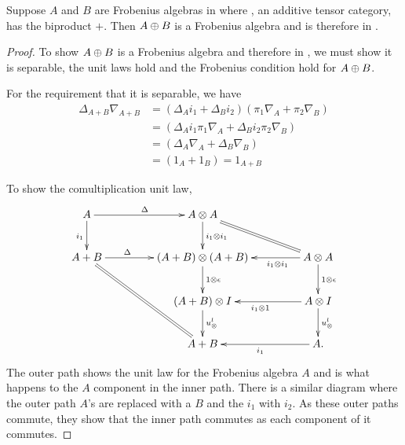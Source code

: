 \begin{lemma}\label{prop:biproducts-of-frobenius-objects-are-frobenius}
  Suppose $A$ and $B$ are Frobenius algebras in \CFrob where \X, an additive tensor category, has
  the biproduct $+$.
  Then $A\oplus B$ is a Frobenius algebra and is therefore in \CFrob.
\end{lemma}
\begin{proof}

  To show $A\oplus B$ is a Frobenius algebra and therefore in \CFrob, we must show it is separable,
  the unit laws hold and the Frobenius condition hold for $A\oplus B$.

  For the requirement that it is separable, we have
  \begin{align*}
    \Delta_{A+B}\nabla_{A+B}&= (\Delta_A i_1 + \Delta_B i_2) (\pi_1 \nabla_A + \pi_2 \nabla_B)\\
    &=  (\Delta_A i_1 \pi_1 \nabla_A + \Delta_B i_2\pi_2 \nabla_B)\\
    &=  (\Delta_A \nabla_A + \Delta_B \nabla_B)\\
    &=  (1_A + 1_B) = 1_{A+B}
  \end{align*}


  To show the comultiplication unit law,
  \[
     \xymatrix@C+20pt{
       A \ar[r]^{\Delta} \ar[d]_{i_1} & A\*A \ar[d]^{i_1\*i_1} \ar@{=}[dr] \\
       A+B \ar[r]^(.35){\Delta} \ar@{=}[ddr] &(A+B)\*(A+B) \ar[d]^{1\*\epsilon}
          & A\*A \ar[l]^(.35){i_1\*i_1}  \ar[d]^{1\*\epsilon}\\
       & (A+B)\*I \ar[d]^{\usl} & A\*I \ar[d]^{\usl} \ar[l]^{i_1\*1}\\
       & A+B & A. \ar[l]^{i_1}
     }
  \]
  The outer path shows the unit law for the Frobenius algebra $A$ and is what happens to the $A$
  component in the inner path. There is a similar diagram where the outer path $A$'s are replaced
  with a $B$ and the $i_1$ with $i_2$. As these outer paths commute, they show that the inner path
  commutes as each component of it commutes.


\end{proof}
